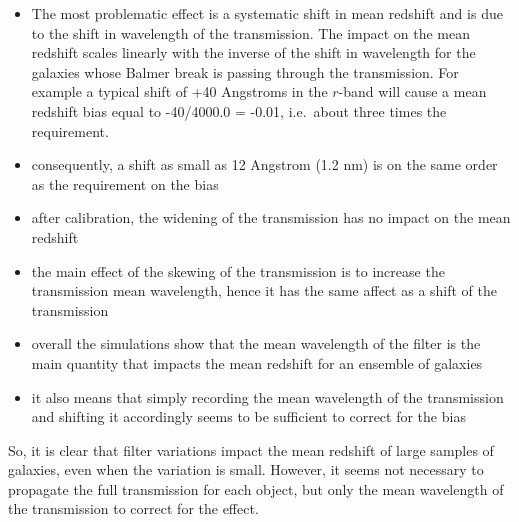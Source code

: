 \documentclass{article}
\begin{document}
\begin{itemize}
\item
  The most problematic effect is a systematic shift in mean redshift and
  is due to the shift in wavelength of the transmission. The impact on
  the mean redshift scales linearly with the inverse of the shift in
  wavelength for the galaxies whose Balmer break is passing through the
  transmission. For example a typical shift of +40 Angstroms in the
  \(r\)-band will cause a mean redshift bias equal to -40/4000.0 =
  -0.01, i.e.~about three times the requirement.
\item
  consequently, a shift as small as 12 Angstrom (1.2 nm) is on the same
  order as the requirement on the bias
\item
  after calibration, the widening of the transmission has no impact on
  the mean redshift
\item
  the main effect of the skewing of the transmission is to increase the
  transmission mean wavelength, hence it has the same affect as a shift
  of the transmission
\item
  overall the simulations show that the mean wavelength of the filter is
  the main quantity that impacts the mean redshift for an ensemble of
  galaxies
\item
  it also means that simply recording the mean wavelength of the
  transmission and shifting it accordingly seems to be sufficient to
  correct for the bias
\end{itemize}

So, it is clear that filter variations impact the mean redshift of large
samples of galaxies, even when the variation is small. However, it seems
not necessary to propagate the full transmission for each object, but
only the mean wavelength of the transmission to correct for the effect.


    
    
    
    
\end{document}
